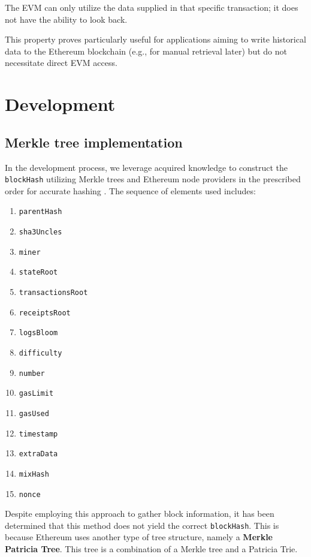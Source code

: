 \documentclass[fleqn,10pt]{olplainarticle}
\begin{document}
The EVM can only utilize the data supplied in that specific transaction; it does not have the ability to look back.

This property proves particularly useful for applications aiming to write historical data to the Ethereum blockchain (e.g., for manual retrieval later) but do not necessitate direct EVM access.

\section{Development}

\subsection{Merkle tree implementation}

In the development process, we leverage acquired knowledge to construct the \texttt{blockHash} utilizing Merkle trees and Ethereum node providers in the prescribed order for accurate hashing \cite{anuragp_answer_2019}. The sequence of elements used includes:

\begin{multicols}{3}
\begin{enumerate}[noitemsep]
	\item \texttt{parentHash}
	\item \texttt{sha3Uncles}
	\item \texttt{miner}
	\item \texttt{stateRoot}
	\item \texttt{transactionsRoot}
	\item \texttt{receiptsRoot}
	\item \texttt{logsBloom}
	\item \texttt{difficulty}
	\item \texttt{number}
	\item \texttt{gasLimit}
	\item \texttt{gasUsed}
	\item \texttt{timestamp}
	\item \texttt{extraData}
	\item \texttt{mixHash}
	\item \texttt{nonce}
\end{enumerate}
\end{multicols}
Despite employing this approach to gather block information, it has been determined that this method does not yield the correct \texttt{blockHash}. This is because Ethereum uses another type of tree structure, namely a \textbf{Merkle Patricia Tree}. This tree is a combination of a Merkle tree and a Patricia Trie.
\end{document}
